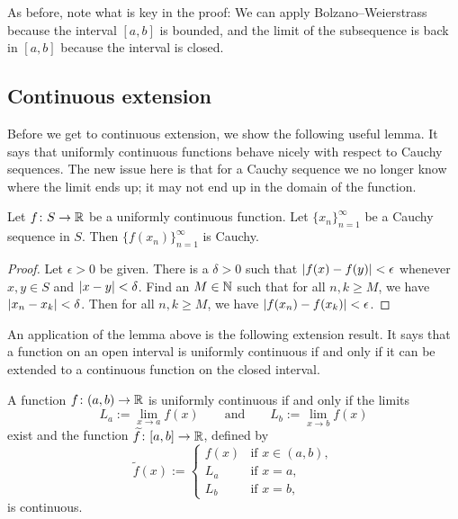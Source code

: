 As before, note what is key in the proof: We can apply Bolzano--Weierstrass
because the interval $[a,b]$ is bounded, and the limit of the subsequence is
back in $[a,b]$ because the interval is closed.

\subsection{Continuous extension}

Before we get to continuous extension, we show the following useful lemma.
It says that uniformly continuous functions behave nicely with respect
to Cauchy sequences.  The new issue here is that for a Cauchy sequence
we no longer know where the limit ends up; it may not end up in the domain
of the function.

\begin{lemma} \label{unifcauchycauchy:lemma}
Let $f \colon S \to {\mathbb{R}}$ be a uniformly continuous function.  Let
$\{ x_n \}_{n=1}^\infty$ be a Cauchy sequence in $S$.
Then $\bigl\{ f(x_n) \bigr\}_{n=1}^\infty$ is Cauchy.
\end{lemma}

\begin{proof}
Let $\epsilon > 0$ be given.  There is a $\delta > 0$ such that
$\left\lvert {f(x)-f(y)} \right\rvert < \epsilon$ whenever $x,y \in S$ and $\left\lvert {x-y} \right\rvert < \delta$.  Find an $M
\in {\mathbb{N}}$ such that for all $n, k \geq M$, we have $\left\lvert {x_n-x_k} \right\rvert < \delta$.
Then for all $n, k \geq M$, we have $\left\lvert {f(x_n)-f(x_k)} \right\rvert < \epsilon$.
\end{proof}

An application of the lemma above is the following extension result.  It says that
a function on an open interval is uniformly continuous if and only if
it can be extended to a continuous function on the closed interval.

\begin{prop} \label{context:prop}
A function $f \colon (a,b) \to {\mathbb{R}}$ is uniformly continuous if and only if
the limits 
\begin{equation*}
L_a := \lim_{x \to a} f(x) \qquad \text{and} \qquad
L_b := \lim_{x \to b} f(x)
\end{equation*}
exist and the function $\widetilde{f} \colon [a,b] \to {\mathbb{R}}$,
defined by
\begin{equation*}
\widetilde{f}(x) :=
\begin{cases}
f(x) & \text{if } x \in (a,b), \\
L_a & \text{if } x = a, \\
L_b & \text{if } x = b,
\end{cases}
\end{equation*}
is continuous.
\end{prop}

